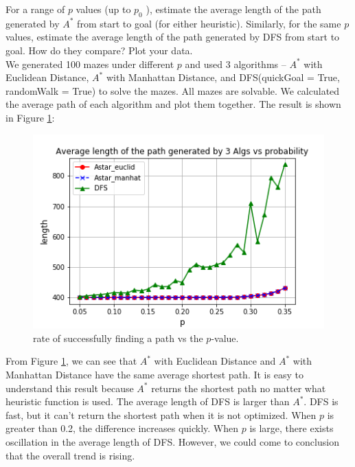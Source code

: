 \documentclass[letter]{article}
\begin{document}
\begin{questions}
	\item {For a range of $ p $ values (up to $ p_0 $ ), estimate the average length of the path generated by $ A^* $ from start to goal (for either heuristic). Similarly, for the same $ p $ values, estimate the average length of the path generated by DFS from start to goal. How do they compare? Plot your data.} \\
	
	We generated 100 mazes under different $ p $ and used 3 algorithms -- $ A^* $ with Euclidean Distance, $ A^* $ with Manhattan Distance, and DFS(quickGoal = True, randomWalk = True) to solve the mazes. All mazes are solvable. We calculated the average path of each algorithm and plot them together. The result is shown in Figure \ref{fig:5}: \\
	
	\begin{figure}
		\centering
		\includegraphics[width=\textwidth]{../pics/question5.png}
		\caption{\label{fig:5}rate of successfully finding a path vs the $ p $-value.}
	\end{figure}
	
	From Figure \ref{fig:5}, we can see that $ A^* $ with Euclidean Distance and $ A^* $ with Manhattan Distance have the same average shortest path. It is easy to understand this result because $ A^* $ returns the shortest path no matter what heuristic function is used. The average length of DFS is larger than $ A^* $. DFS is fast, but it can’t return the shortest path when it is not optimized. When $ p $ is greater than 0.2, the difference increases quickly. When $ p $ is large, there exists oscillation in the average length of DFS. However, we could come to conclusion that the overall trend is rising. \\
	

\end{questions}
\end{document}
